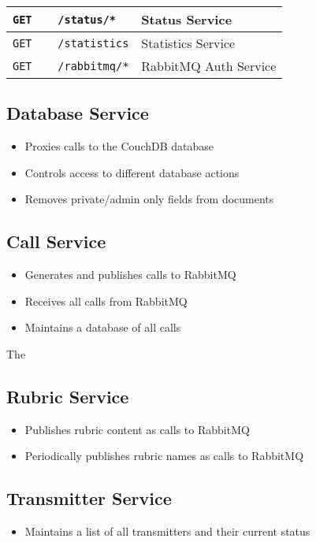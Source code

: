 \begin{center}
\begin{tabular}{|l|l|}
    \verb|GET    /status/*| & Status Service \\ \hline

    \verb|GET    /statistics| & Statistics Service \\ \hline

    \verb|GET    /rabbitmq/*| & RabbitMQ Auth Service \\ \hline
  \end{tabular}
\end{center}

\subsection{Database Service}
\begin{itemize}
\item Proxies calls to the CouchDB database
\item Controls access to different database actions
\item Removes private/admin only fields from documents
\end{itemize}

\subsection{Call Service}
\begin{itemize}
\item Generates and publishes calls to RabbitMQ
\item Receives all calls from RabbitMQ
\item Maintains a database of all calls
\end{itemize}

The 

\subsection{Rubric Service}
\begin{itemize}
\item Publishes rubric content as calls to RabbitMQ
\item Periodically publishes rubric names as calls to RabbitMQ
\end{itemize}

\subsection{Transmitter Service}
\begin{itemize}
\item Maintains a list of all transmitters and their current status
\end{itemize}

